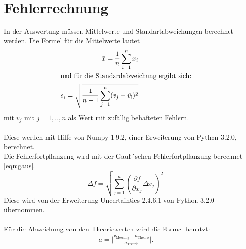 \newpage
\section{Fehlerrechnung}
\label{fehlerrechnung}
In der Auswertung müssen Mittelwerte und Standartabweichungen berechnet werden.
Die Formel für die Mittelwerte lautet
\begin{align}
  \bar{x}=\frac{1}{n} \sum_{i=1}^n x_i\\
\intertext{und für die Standardabweichung ergibt sich:}
s_i=\sqrt{\frac{1}{n-1}\sum_{j=1}^n (v_j-\bar{v_i})^2}
\end{align}
mit $v_j$ mit $j=1,..,n$ als Wert mit zufällig behafteten Fehlern.\\
\\
Diese werden mit Hilfe von
Numpy 1.9.2, einer Erweiterung von Python 3.2.0, berechnet.
\\
Die Fehlerfortpflanzung wird mit der Gauß´schen Fehlerfortpflanzung berechnet
 \eqref{eqn:gaus}.
\begin{equation}
\Delta f=\sqrt{\sum_{j=1}^n \left(\frac{\partial f}{\partial x_j}\Delta x_j \right)^{2} }\label{eqn:gaus}.
\end{equation}
Diese wird von der Erweiterung Uncertainties 2.4.6.1 von Python 3.2.0 übernommen.\\
\\
Für die Abweichung von den Theoriewerten wird die Formel benutzt:
\begin{align}
 a=\biggl|  \frac{a_\mathrm{Messung}-a_\mathrm{Theorie}}{a_\mathrm{Theorie}}  \biggr|.
\end{align}
